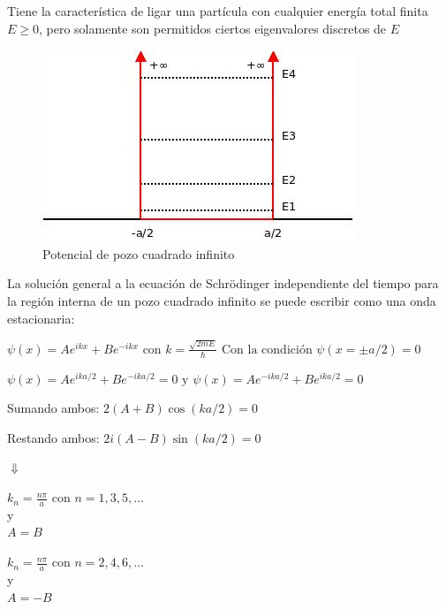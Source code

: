 \documentclass[oneside]{book}
\numberwithin{equation}{section}
\numberwithin{figure}{section}
\numberwithin{table}{section}
\begin{document}
				Tiene la característica de ligar una partícula con cualquier energía total finita $E \geq 0$, pero solamente son permitidos ciertos eigenvalores discretos de $E$\\
				
				\begin{figure}[H]
					\includegraphics[scale=1]{PozoInfinito.jpeg}
					\caption{Potencial de pozo cuadrado infinito}
				\end{figure}				
				
				La solución general a la ecuación 	de Schrödinger independiente del tiempo para la región interna de un pozo cuadrado infinito se puede escribir como una onda estacionaria:\\
				
				\begin{center}
					$\displaystyle \psi(x)=Ae^{ikx}+Be^{-ikx} \text{ con } k=\frac{\sqrt{2mE}}{\hbar} \text{ Con la condición } \psi(x=\pm a/2)=0$
				\end{center}
				\begin{center}
					$\displaystyle \psi(x)=Ae^{ika/2}+Be^{-ika/2}=0 \text{  y  }  \psi(x)=Ae^{-ika/2}+Be^{ika/2}=0$
				\end{center}
				\begin{center}
					Sumando ambos: $\displaystyle 2(A+B)\cos(ka/2)=0$
				\end{center}
				\begin{center}
					Restando ambos: $\displaystyle 2i(A-B)\sin(ka/2)=0$
				\end{center}
				\begin{center}
					$\Downarrow$
				\end{center}
				
				\begin{minipage}[t]{0.4\textwidth}				
					\begin{center}
						$\displaystyle k_n=\frac{n\pi}{a} \text{ con } n=1,3,5,\ldots$\\
						y\\
						$A=B$
					\end{center}
				\end{minipage}
				\begin{minipage}[t]{0.4\textwidth}				
					\begin{center}
						$\displaystyle k_n=\frac{n\pi}{a} \text{ con } n=2,4,6,\ldots$\\
						y\\
						$A=-B$
					\end{center}
				\end{minipage}
				
\end{document}
